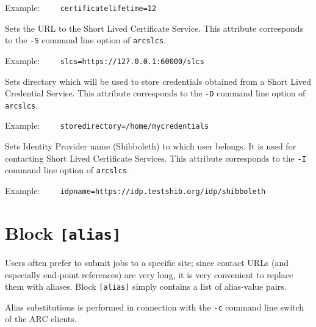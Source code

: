 Example:
\verb#    certificatelifetime=12#

{}
\hspace*{0.5cm}
\begin{shaded}
\end{shaded}

Sets the URL to the Short Lived Certificate Service. This attribute
corresponds to the \verb#-S# command line option of \texttt{arcslcs}.

Example:
\verb#    slcs=https://127.0.0.1:60000/slcs#

{}
\hspace*{0.5cm}
\begin{shaded}
\end{shaded}

Sets directory which will be used to store credentials obtained from a Short
Lived Credential Servise. This attribute
corresponds to the \verb#-D# command line option of \texttt{arcslcs}.

Example:
\verb#    storedirectory=/home/mycredentials#

{}
\hspace*{0.5cm}
\begin{shaded}
\end{shaded}

Sets Identity Provider name (Shibboleth) to which user belongs. It is used for
contacting Short Lived Certificate Services. This attribute
corresponds to the \verb#-I# command line option of \texttt{arcslcs}.

Example:
\verb#    idpname=https://idp.testshib.org/idp/shibboleth#


\section{Block \texttt{[alias]}}

Users often prefer to submit jobs to a specific site; since contact URLs (and
especially end-point references) are very long, it is very convenient to replace
them with aliases. Block \texttt{[alias]} simply contains a list of
alias-value pairs.
 
 Alias substitutions is performed in connection with the \verb#-c# command line
 switch of the ARC clients.


